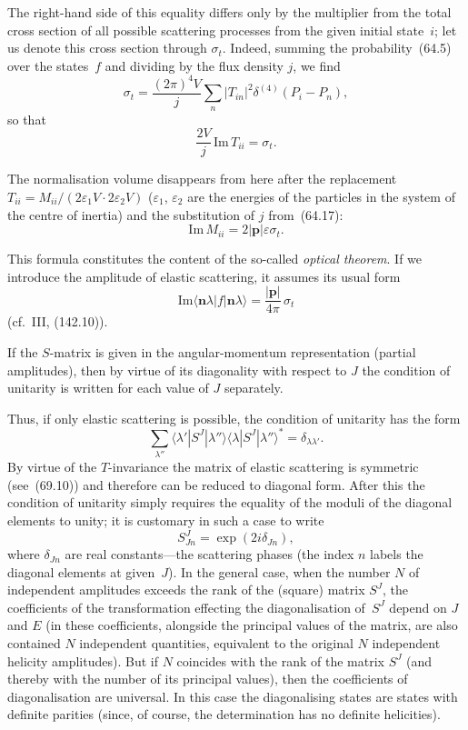 The right-hand side of this equality differs only by the multiplier from the total cross section of all possible scattering processes from the given initial state~$i$; let us denote this cross section through $\sigma_t$. Indeed, summing the probability~(64.5) over the states~$f$ and dividing by the flux density $j$, we find
\[
\sigma_t = \frac{(2\pi)^4 V}{j}\sum_n|T_{in}|^2\delta^{(4)}(P_i - P_n),
\]
so that
\[
\frac{2V}{j}\,\mathrm{Im}\,T_{ii} = \sigma_t.
\]

The normalisation volume disappears from here after the replacement $T_{ii} = M_{ii}/(2\varepsilon_1 V \cdot 2\varepsilon_2 V)$ ($\varepsilon_1$, $\varepsilon_2$ are the energies of the particles in the system of the centre of inertia) and the substitution of $j$ from~(64.17):
\begin{equation}
\mathrm{Im}\,M_{ii} = 2|\mathbf{p}|\varepsilon\sigma_t.
\tag{71.9}
\end{equation}

This formula constitutes the content of the so-called \textit{optical theorem}. If we introduce the amplitude of elastic scattering, it assumes its usual form
\begin{equation}
\mathrm{Im}\langle\mathbf{n}\lambda|f|\mathbf{n}\lambda\rangle = \frac{|\mathbf{p}|}{4\pi}\,\sigma_t
\tag{71.10}
\end{equation}
(cf.~III, (142.10)).

If the $S$-matrix is given in the angular-momentum representation (partial amplitudes), then by virtue of its diagonality with respect to $J$ the condition of unitarity is written for each value of $J$ separately.

Thus, if only elastic scattering is possible, the condition of unitarity has the form
\begin{equation}
\sum_{\lambda''}\langle\lambda'|S^J|\lambda''\rangle\langle\lambda|S^J|\lambda''\rangle^* = \delta_{\lambda\lambda'}.
\tag{71.11}
\end{equation}
By virtue of the $T$-invariance the matrix of elastic scattering is symmetric (see~(69.10)) and therefore can be reduced to diagonal form. After this the condition of unitarity simply requires the equality of the moduli of the diagonal elements to unity; it is customary in such a case to write
\begin{equation}
S^J_{Jn} = \exp(2i\delta_{Jn}),
\tag{71.12}
\end{equation}
where $\delta_{Jn}$ are real constants---the scattering phases (the index $n$ labels the diagonal elements at given~$J$). In the general case, when the number $N$ of independent amplitudes exceeds the rank of the (square) matrix $S^J$, the coefficients of the transformation effecting the diagonalisation of~$S^J$ depend on $J$ and $E$ (in these coefficients, alongside the principal values of the matrix, are also contained $N$ independent quantities, equivalent to the original $N$ independent helicity amplitudes). But if $N$ coincides with the rank of the matrix $S^J$ (and thereby with the number of its principal values), then the coefficients of diagonalisation are universal. In this case the diagonalising states are states with definite parities (since, of course, the determination has no definite helicities).

